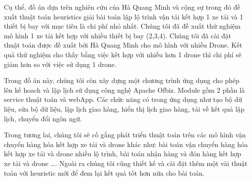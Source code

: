 \documentclass[a4paper,12pt]{report}
\begin{document}
Cụ thể, đồ án dựa trên nghiên cứu của Hà Quang Minh và cộng sự trong đó đề xuất thuật toán heuristics giải bài toán lập lộ trình vận tải kết hợp 1 xe tải và 1 thiết bị bay với mục tiêu là chi phí nhỏ nhất. Chúng tôi đã đề xuất thử nghiệm mô hình 1 xe tải kết hợp với nhiều thiết bị bay (2,3,4). Chúng tôi đã cài đặt thuật toán được đề xuất bởi Hà Quang Minh cho mô hình với nhiều Drone. Kết quả thử nghiệm cho thấy bằng việc kết hợp với nhiều hơn 1 drone thì chi phí sẽ giảm hơn so với việc sử dụng 1 drone.

Trong đồ án này, chúng tôi còn xây dựng một chương trình ứng dụng cho phép lên kế hoach và lập lịch sử dụng công nghệ Apache Ofbiz. Module gồm 2 phần là service thuật toán và webApp. Các chức năng có trong ứng dụng như tạo bộ dữ liệu, sửa bộ dữ liệu, lập lịch giao hàng, hiển thị lịch giao hàng, tải về kết quả lập lịch, chuyển đổi ngôn ngữ. 

Trong tương lai, chúng tôi sẽ cố gắng phát triển thuật toán trên các mô hình vận chuyển hàng hóa kết hợp xe tải và drone khác như: bài toán vận chuyển hàng hóa kết hợp xe tải và drone nhiều lộ trình, bài toán nhận hàng và đón hàng kết hợp xe tải và drone \ldots. Ngoài ra chúng tôi cũng thiết kế và cài đặt thêm một vài thuật toán với heuristic mới để đem lại kết quả tốt hơn nữa cho bài toán.
\end{document}
